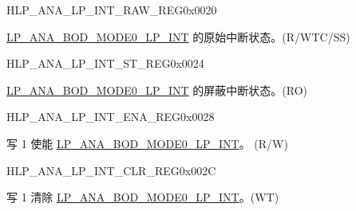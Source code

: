 \begin{register}{H}{LP\_ANA\_LP\_INT\_RAW\_REG}{0x0020}\label{regdesc:LPANALPINTRAWREG}
%
%
\regnewline%
\begin{regdesc}\begin{reglist}
\label{fielddesc:LPANABODMODE0LPINTRAW}\item [LP\_ANA\_BOD\_MODE0\_LP\_INT\_RAW] \hyperref[int:LPANABODMODE0LPINT]{LP\_ANA\_BOD\_MODE0\_LP\_INT} 的原始中断状态。(R/WTC/SS)
\end{reglist}\end{regdesc}
\end{register}
\begin{register}{H}{LP\_ANA\_LP\_INT\_ST\_REG}{0x0024}\label{regdesc:LPANALPINTSTREG}%
%
\regnewline%
\begin{regdesc}\begin{reglist}
\label{fielddesc:LPANABODMODE0LPINTST}\item [LP\_ANA\_BOD\_MODE0\_LP\_INT\_ST] \hyperref[int:LPANABODMODE0LPINT]{LP\_ANA\_BOD\_MODE0\_LP\_INT} 的屏蔽中断状态。(RO)
\end{reglist}\end{regdesc}
\end{register}

\begin{register}{H}{LP\_ANA\_LP\_INT\_ENA\_REG}{0x0028}\label{regdesc:LPANALPINTENAREG}
%
%
\regnewline%
\begin{regdesc}\begin{reglist}
\label{fielddesc:LPANABODMODE0LPINTENA}\item [LP\_ANA\_BOD\_MODE0\_LP\_INT\_ENA] 写 1 使能 \hyperref[int:LPANABODMODE0LPINT]{LP\_ANA\_BOD\_MODE0\_LP\_INT}。
(R/W)
\end{reglist}\end{regdesc}
\end{register}

\begin{register}{H}{LP\_ANA\_LP\_INT\_CLR\_REG}{0x002C}\label{regdesc:LPANALPINTCLRREG}
%
%
\regnewline%
\begin{regdesc}\begin{reglist}
\label{fielddesc:LPANABODMODE0LPINTCLR}\item [LP\_ANA\_BOD\_MODE0\_LP\_INT\_CLR] 写 1 清除 \hyperref[int:LPANABODMODE0LPINT]{LP\_ANA\_BOD\_MODE0\_LP\_INT}。(WT)
\end{reglist}\end{regdesc}
\end{register}

